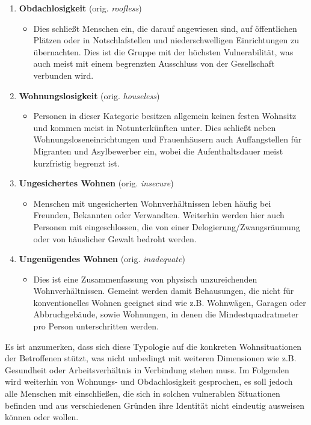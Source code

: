 \begin{enumerate}
	\item \textbf{Obdachlosigkeit} (orig. \textit{roofless})
	\begin{itemize}
		\item[] Dies schließt Menschen ein, die darauf angewiesen sind, auf öffentlichen Plätzen oder in Notschlafstellen und niederschwelligen Einrichtungen zu übernachten. Dies ist die Gruppe mit der höchsten Vulnerabilität, was auch meist mit einem begrenzten Ausschluss von der Gesellschaft verbunden wird.
	\end{itemize} \newpage
	\item \textbf{Wohnungslosigkeit} (orig. \textit{houseless})
		\begin{itemize}
			\item[] Personen in dieser Kategorie besitzen allgemein keinen festen Wohnsitz und kommen meist in Notunterkünften unter. Dies schließt neben Wohnungsloseneinrichtungen und Frauenhäusern auch Auffangstellen für Migranten und Asylbewerber ein, wobei die Aufenthaltsdauer meist kurzfristig begrenzt ist.
		\end{itemize}
	\item \textbf{Ungesichertes Wohnen} (orig. \textit{insecure})
		\begin{itemize}
			\item[] Menschen mit ungesicherten Wohnverhältnissen leben häufig bei Freunden, Bekannten oder Verwandten. Weiterhin werden hier auch Personen mit eingeschlossen, die von einer Delogierung/Zwangsräumung oder von häuslicher Gewalt bedroht werden.
		\end{itemize}
	\item \textbf{Ungenügendes Wohnen} (orig. \textit{inadequate})
		\begin{itemize}
			\item[] Dies ist eine Zusammenfassung von physisch unzureichenden Wohnverhältnissen. Gemeint werden damit Behausungen, die nicht für konventionelles Wohnen geeignet sind wie z.B. Wohnwägen, Garagen oder Abbruchgebäude, sowie Wohnungen, in denen die Mindestquadratmeter pro Person unterschritten werden.
		\end{itemize}
\end{enumerate}

Es ist anzumerken, dass sich diese Typologie auf die konkreten Wohnsituationen der Betroffenen stützt, was nicht unbedingt mit weiteren Dimensionen wie z.B. Gesundheit oder Arbeitsverhältnis in Verbindung stehen muss. Im Folgenden wird weiterhin von Wohnungs- und Obdachlosigkeit gesprochen, es soll jedoch alle Menschen mit einschließen, die sich in solchen vulnerablen Situationen befinden und aus verschiedenen Gründen ihre Identität nicht eindeutig ausweisen können oder wollen.


